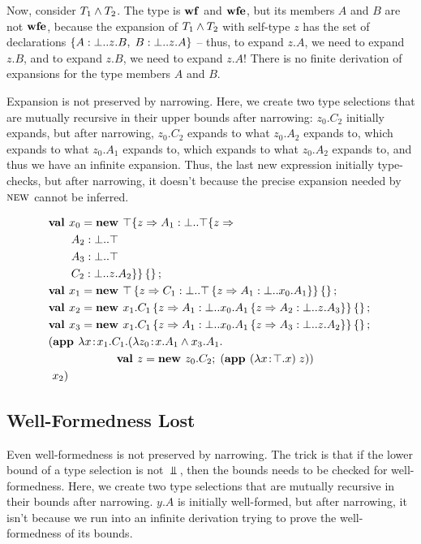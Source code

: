 \documentclass[9pt]{sigplanconf}
\begin{document}
Now, consider $T_1 \wedge T_2$. The type is $\mbox{\textbf{wf}}$ and $\mbox{\textbf{wfe}}$, but
its members $A$ and $B$ are not $\mbox{\textbf{wfe}}$, because the expansion of
$T_1 \wedge T_2$ with self-type $z$ has the set of declarations
$\{A : \bot..z.B,\;B : \bot..z.A\}$ -- thus, to expand
$z.A$, we need to expand $z.B$, and to expand $z.B$, we need to expand
$z.A$! There is no finite derivation of expansions for the type
members $A$ and $B$.

Expansion is not preserved by narrowing. Here, we create two type
selections that are mutually recursive in their upper bounds after
narrowing: $z_0.C_2$ initially expands, but after narrowing, $z_0.C_2$
expands to what $z_0.A_2$ expands to, which expands to what $z_0.A_1$
expands to, which expands to what $z_0.A_2$ expands to, and thus we
have an infinite expansion. Thus, the last new expression initially
type-checks, but after narrowing, it doesn't because the precise
expansion needed by $\textsc{new}$ cannot be inferred.

\begin{align*}
&\mlnew {x_0} {\Top \mlrefine z { \Ldecl {A_1} \Bot {\Top \mlrefine z {\\
&\gap\Ldecl {A_2} \Bot \Top\\
&\gap\Ldecl {A_3} \Bot \Top\\
&\gap\Ldecl {C_2} \Bot {z.A_2}}}}\ldefs{}}{
\mlnew {x_1} {\Top \refine z {\Ldecl {C_1} \Bot {\Top \refine z {\Ldecl {A_1} \Bot {x_0.A_1}}}}\ldefs{}}}{
\mlnew {x_2} {{x_1.C_1} \refine z {\Ldecl {A_1} \Bot {{x_0.A_1} \refine z {\Ldecl {A_2} \Bot {z.A_3}}}}\ldefs{}}}{
\mlnew {x_3} {{x_1.C_1} \refine z {\Ldecl {A_1} \Bot {{x_0.A_1} \refine z {\Ldecl {A_3} \Bot {z.A_2}}}}\ldefs{}}}{
\mlapp {\abs x {x_1.C_1} {(\abs {z_0} {x.A_1 \tand x_3.A_1} {\\&\gap\gap\gap\new z {z_0.C_2} {\app {(\abs x \Top x)} z}})}} {\ x_2}}
\end{align*}

\subsection{Well-Formedness Lost}\label{narrowing_wf}

Even well-formedness is not preserved by narrowing. The trick is that
if the lower bound of a type selection is not $\Bot$, then the
bounds needs to be checked for well-formedness. Here, we create two
type selections that are mutually recursive in their bounds
after narrowing. $y.A$ is initially well-formed, but after narrowing,
it isn't because we run into an infinite derivation trying to prove
the well-formedness of its bounds.
\end{document}
